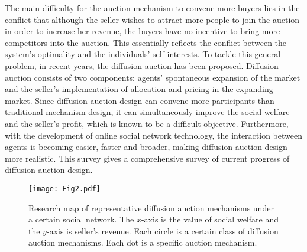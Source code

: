 \documentclass{article}
\begin{document}
The main difficulty for the auction mechanism to convene more buyers 
lies in the conflict that although the seller wishes to attract more people to join the auction in order to increase her revenue, the buyers have no incentive to bring more competitors into the auction. This essentially reflects the conflict between the system’s optimality and the individuals' self-interests. 
To tackle this general problem, in recent years, the diffusion auction has been proposed. 
Diffusion auction consists of two components: agents' spontaneous expansion of the market and the seller's implementation of allocation and pricing in the expanding market. Since diffusion auction design can convene more participants than traditional mechanism design, it can simultaneously improve the social welfare and the seller's profit, which is known to be a difficult objective. Furthermore, with the development of online social network technology, the interaction between agents is becoming easier, faster and broader, making diffusion auction design more realistic.
This survey gives a comprehensive survey of current progress of diffusion auction design.
\begin{figure}[!htbp]
    \centering
    \texttt{[image: Fig2.pdf]}
    \caption{Research map of representative diffusion auction mechanisms under a certain social network. The $x$-axis is the value of social welfare and the $y$-axis is seller's revenue. Each circle is a certain class of diffusion auction mechanisms. Each dot is a specific auction mechanism.}
    \label{fig_mechanisms}
\end{figure}
\end{document}
